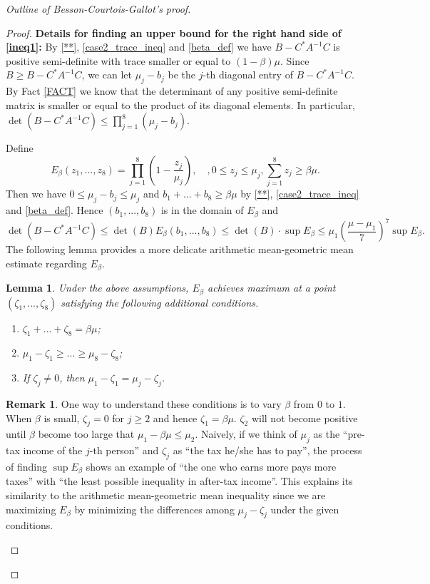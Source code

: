 \documentclass{article}
\newtheorem{lem}[thm]{Lemma}
\theoremstyle{definition}
\newtheorem*{rmk}{Remark}
\begin{document}
\begin{proof}[Outline of Besson-Courtois-Gallot's proof]
\begin{proof}
\textbf{Details for finding an upper bound for the right hand side of \eqref{ineq1}:} By \eqref{**}, \eqref{case2_trace_ineq} and \eqref{beta_def} we have $B-C^*A^{-1}C$ is positive semi-definite with trace smaller or equal to $(1-\beta)\mu$. Since $B\geq B-C^*A^{-1}C$, we can let $\mu_j-b_j$ be the $j$-th diagonal entry of $B-C^*A^{-1}C$. By Fact \ref{FACT} we know that the determinant of any positive semi-definite matrix is smaller or equal to the product of its diagonal elements. In particular, $\det(B-C^*A^{-1}C)\leq\prod_{j=1}^8(\mu_j-b_j)$.

Define 
$$E_\beta(z_1,...,z_8)=\prod_{j=1}^8\left(1-\frac{z_j}{\mu_j}\right),\quad, 0\leq z_j\leq \mu_j, \sum_{j=1}^8z_j\geq \beta\mu.$$
Then we have $0\leq \mu_j-b_j\leq \mu_j$ and $b_1+...+b_8\geq \beta\mu$ by \eqref{**}, \eqref{case2_trace_ineq} and \eqref{beta_def}. Hence $(b_1,...,b_8)$ is in the domain of $E_\beta$ and
$$\det(B-C^*A^{-1}C)\leq\det(B)E_\beta(b_1,...,b_8)\leq\det(B)\cdot\sup E_\beta\leq \mu_1\left(\frac{\mu-\mu_1}{7}\right)^7\sup E_\beta.$$
The following lemma provides a more delicate arithmetic mean-geometric mean estimate regarding $E_\beta$.  
\begin{lem}\label{fact2} Under the above assumptions, $E_\beta$ achieves maximum at a point $(\zeta_1,...,\zeta_8)$ satisfying the following additional conditions.
\begin{enumerate}
\item[(1).] $\zeta_1+...+\zeta_8=\beta\mu$;
\item[(2).] $\mu_1-\zeta_1\geq...\geq\mu_8-\zeta_8$;
\item[(3).] If $\zeta_j\neq 0$, then $\mu_1-\zeta_1=\mu_j-\zeta_j$.
\end{enumerate}
\end{lem}
\begin{rmk}
One way to understand these conditions is to vary $\beta$ from $0$ to $1$. When $\beta$ is small, $\zeta_j=0$ for $j\geq 2$ and hence $\zeta_1=\beta\mu$. $\zeta_2$ will not become positive until $\beta$ become too large that $\mu_1-\beta\mu\leq\mu_2$. Naively, if we think of $\mu_j$ as the ``pre-tax income of the $j$-th person'' and $\zeta_j$ as ``the tax he/she has to pay'', the process of finding $\sup E_\beta$ shows an example of ``the one who earns more pays more taxes'' with ``the least possible inequality in after-tax income''. This explains its similarity to the arithmetic mean-geometric mean inequality since we are maximizing $E_\beta$ by minimizing the differences among $\mu_j-\zeta_j$ under the given conditions. 

\end{rmk}
\end{proof}
\end{proof}
\end{document}
